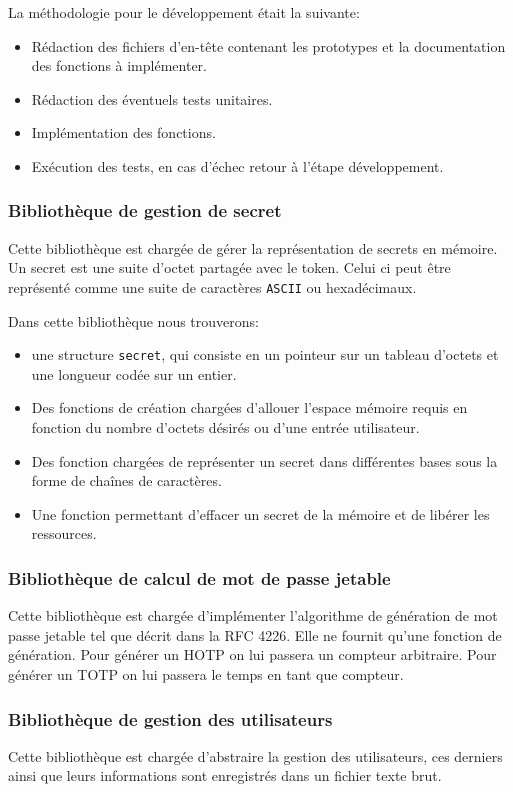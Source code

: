 La méthodologie pour le développement était la suivante:
\begin{itemize}
  \item Rédaction des fichiers d'en-tête contenant les prototypes et la
  documentation des fonctions à implémenter.
  \item Rédaction des éventuels tests unitaires.
  \item Implémentation des fonctions.
  \item Exécution des tests, en cas d'échec retour à l'étape développement.
\end{itemize}

\subsubsection{Bibliothèque de gestion de secret}
Cette bibliothèque est chargée de gérer la représentation de secrets en mémoire.
Un secret est une suite d'octet partagée avec le token. Celui ci peut être
représenté comme une suite de caractères \verb?ASCII? ou hexadécimaux.

Dans cette bibliothèque nous trouverons:
\begin{itemize}
  \item une structure \verb?secret?, qui consiste en un pointeur sur un tableau
  d'octets et une longueur codée sur un entier.
  \item Des fonctions de création chargées d'allouer l'espace mémoire requis en
  fonction du nombre d'octets désirés ou d'une entrée utilisateur.
  \item Des fonction chargées de représenter un secret dans différentes bases
  sous la forme de chaînes de caractères.
  \item Une fonction permettant d'effacer un secret de la mémoire et de
  libérer les ressources.
\end{itemize}

\subsubsection{Bibliothèque de calcul de mot de passe jetable}
Cette bibliothèque est chargée d'implémenter l'algorithme de génération de mot
passe jetable tel que décrit dans la RFC 4226\cite{HOTPrfc}. Elle ne fournit
qu'une fonction de génération. Pour générer un HOTP on lui passera un compteur
arbitraire. Pour générer un TOTP on lui passera le temps en tant que compteur.

\subsubsection{Bibliothèque de gestion des utilisateurs}
Cette bibliothèque est chargée d'abstraire la gestion des utilisateurs, ces
derniers ainsi que leurs informations sont enregistrés dans un fichier texte
brut.

